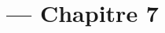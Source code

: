 
\title{\TSwiftTitle{} --- Chapitre 7}

\newcommand{\TSwiftRoot}[0]{../..} %



\maketitle

\tableofcontents




